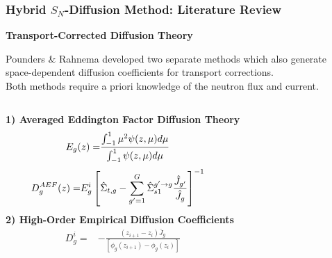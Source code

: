 \begin{frame}
  \frametitle{Hybrid $S_N$-Diffusion Method: Literature Review}
  \textbf{Transport-Corrected Diffusion Theory}
  \vspace{.2cm}

  Pounders \& Rahnema \cite{pounders_diffusion_2009} developed two separate methods which also
  generate space-dependent diffusion coefficients for transport corrections. \\
  Both methods require a priori knowledge of the neutron flux and current.
  \vspace{.2cm}
  \begin{columns}
    \textbf{1) Averaged Eddington Factor Diffusion Theory}
    \begin{align}
      \small
      E_g(z) =& \frac{\int^1_{-1} \mu^2\psi(z,\mu)d\mu}{\int^1_{-1} \psi(z,\mu)d\mu}
    \end{align}
    \begin{align}
      \small
      D^{AEF}_g(z) =& E^i_g\left[\hat{\Sigma}_{t,g}-\sum^G_{g'=1}\hat{\Sigma}^{g'\rightarrow g}_{s1}
      \frac{\hat{J}_{g'}}{\hat{J}_g}\right]^{-1}
    \end{align}
    \hfill
    \textbf{2) High-Order Empirical Diffusion Coefficients}
    \begin{align}
      D^i_g =& -\frac{\left(z_{i+1}-z_i\right) \bar{J}_g}{\left[\phi_g(z_{i+1})-\phi_g(z_i)\right]}
      \label{eq:emp}
    \end{align}
  \end{columns}
\end{frame}

